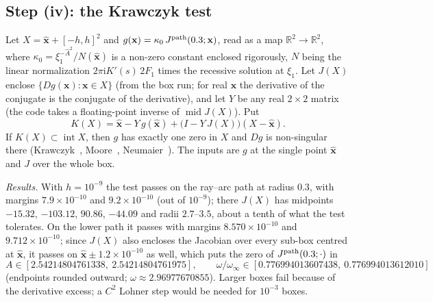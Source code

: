 \documentclass{amsart}
\numberwithin{equation}{section}
\theoremstyle{plain}
\theoremstyle{definition}
\theoremstyle{remark}
\newcommand{\winf}{\omega_\infty}
\newcommand{\bx}{\mathbf{x}}
\newcommand{\hx}{\hat{\mathbf{x}}}
\newcommand{\iu}{\mathrm{i}}
\begin{document}
\subsection{Step (iv): the Krawczyk test}
Let $X = \hx + [-h, h]^2$ and $g(\bx) = \kappa_0\,J^{\rm path}(0.3; \bx)$, read as a map $\mathbb R^2 \to \mathbb R^2$, where
$\kappa_0 = \xi_1^{-\hat A^2}/N(\hx)$ is a non-zero constant enclosed rigorously, $N$ being the linear normalization
$2\pi\iu K'(s)\,2F_1$ times the recessive solution at $\xi_1$. Let $J(X)$ enclose $\{Dg(\bx) : \bx \in X\}$ (from the box run;
for real $\bx$ the derivative of the conjugate is the conjugate of the derivative), and let $Y$ be any real $2\times2$ matrix (the
code takes a floating-point inverse of $\operatorname{mid}J(X)$). Put
\begin{equation}\label{eq:krawczyk}
K(X) = \hx - Y\,g(\hx) + \big(I - Y\,J(X)\big)(X - \hx) .
\end{equation}
If $K(X) \subset \operatorname{int}X$, then $g$ has exactly one zero in $X$ and $Dg$ is non-singular there
(Krawczyk~\cite{Krawczyk1969}, Moore~\cite{Moore1977}, Neumaier~\cite{Neumaier1990}). The inputs are $g$ at the single point
$\hx$ and $J$ over the whole box.

\emph{Results.} With $h = 10^{-9}$ the test passes on the ray--arc path at radius $0.3$, with margins $7.9\times10^{-10}$ and
$9.2\times10^{-10}$ (out of $10^{-9}$); there $J(X)$ has midpoints $-15.32$, $-103.12$, $90.86$, $-44.09$ and radii $2.7$--$3.5$, about
a tenth of what the test tolerates. On the lower path it passes with margins $8.570\times10^{-10}$ and $9.712\times10^{-10}$; since
$J(X)$ also encloses the Jacobian over every sub-box centred at $\hx$, it passes on $\hx \pm 1.2\times10^{-10}$ as well, which
puts the zero of $J^{\rm path}(0.3;\cdot)$ in
\begin{equation}\label{eq:zerobox}
A \in [2.54214804761338,\ 2.54214804761975], \qquad \omega/\winf \in [0.776994013607438,\ 0.776994013612010]
\end{equation}
(endpoints rounded outward; $\omega \approx 2.96977670855$). Larger boxes fail because of the derivative excess; a $C^2$ Lohner
step would be needed for $10^{-3}$ boxes.
\end{document}
